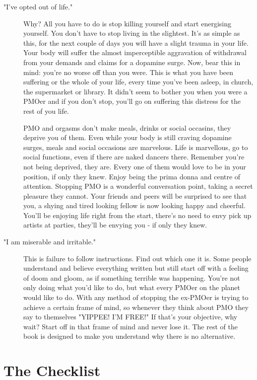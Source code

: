 \documentclass[easypeasy.tex]{subfiles}
\begin{document}
\begin{description}
\begin{description}
      \item ["I've opted out of life."] Why? All you have to do is stop killing yourself and start energising yourself. You don't have to stop living in the slightest. It's as simple as this, for the next couple of days you will have a slight trauma in your life. Your body will suffer the almost imperceptible aggravation of withdrawal from your demands and claims for a dopamine surge. Now, bear this in mind: you're no worse off than you were. This is what you have been suffering or the whole of your life, every time you've been asleep, in church, the supermarket or library. It didn't seem to bother you when you were a PMOer and if you don't stop, you'll go on suffering this distress for the rest of you life.

      PMO and orgasms don't make meals, drinks or social occasins, they deprive you of them. Even while your body is still craving dopamine surges, meals and social occasions are marvelous. Life is marvellous, go to social functions, even if there are naked dancers there. Remember you're not being deprived, they are. Every one of them would love to be in your position, if only they knew. Enjoy being the prima donna and centre of attention. Stopping PMO is a wonderful conversation point, taking a secret pleasure they cannot. Your friends and peers will be surprised to see that you, a shying and tired looking fellow is now looking happy and cheerful. You'll be enjoying life right from the start, there's no need to envy pick up artists at parties, they'll be envying you - if only they knew.

     \item ["I am miserable and irritable."] This is failure to follow instructions. Find out which one it is. Some people understand and believe everything written but still start off with a feeling of doom and gloom, as if something terrible was happening. You're not only doing what you'd like to do, but what every PMOer on the planet would like to do. With any method of stopping the ex-PMOer is trying to achieve a certain frame of mind, so whenever they think about PMO they say to themselves "YIPPEE! I'M FREE!" If that's your objective, why wait? Start off in that frame of mind and never lose it. The rest of the book is designed to make you understand why there is no alternative.

\end{description}
\end{description}

\section{The Checklist}
\end{document}
